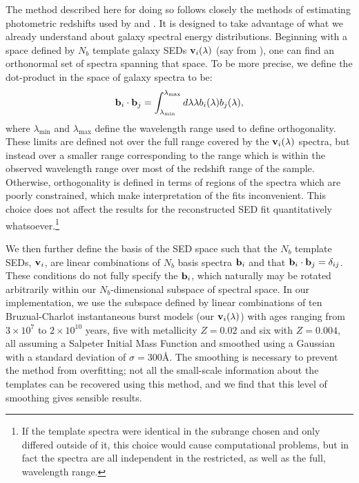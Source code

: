 \documentclass[10pt,preprint]{aastex}
\newcommand{\vv}[1]{{\bf #1}}
\begin{document}
The method described here for doing so follows closely the methods of
estimating photometric redshifts used by \citet{csabai00a} and
\citet{budavari00a}. It is designed to take advantage of what we
already understand about galaxy spectral energy distributions.
Beginning with a space defined by $N_b$ template galaxy SEDs
$\vv{v}_i(\lambda)$ (say from \citealt{bruzual93a}), one can find an
orthonormal set of spectra spanning that space. To be more precise, we
define the dot-product in the space of galaxy spectra to be:
\begin{equation}
\vv{b}_i \cdot \vv{b}_j =
\int_{\lambda_{\mathrm{min}}}^{\lambda_{\mathrm{max}}} d\lambda
\lambda b_i(\lambda) b_j(\lambda),
\end{equation}
where $\lambda_{\mathrm{min}}$ and $\lambda_{\mathrm{max}}$ define the
wavelength range used to define orthogonality. These limits are
defined not over the full range covered by the $\vv{v}_i(\lambda)$
spectra, but instead over a smaller range corresponding to the range
which is within the observed wavelength range over most of the
redshift range of the sample. Otherwise, orthogonality is defined in
terms of regions of the spectra which are poorly constrained, which
make interpretation of the fits inconvenient.  This choice does not
affect the results for the reconstructed SED fit quantitatively
whatsoever.\footnote{If the template spectra were identical in the
subrange chosen and only differed outside of it, this choice would
cause computational problems, but in fact the spectra are all
independent in the restricted, as well as the full, wavelength range.}

We then further define the basis of the SED space such that the $N_b$
template SEDs, $\vv{v}_i$, are linear combinations of $N_b$ basis
spectra $\vv{b}_i$ and that $\vv{b}_i \cdot \vv{b}_j =
\delta_{ij}$. These conditions do not fully specify the $\vv{b}_i$,
which naturally may be rotated arbitrarily within our
$N_b$-dimensional subspace of spectral space.  In our implementation,
we use the subspace defined by linear combinations of ten
Bruzual-Charlot instantaneous burst models (our $\vv{v}_i(\lambda)$)
with ages ranging from $3 \times 10^7$ to $2\times 10^{10}$ years,
five with metallicity $Z=0.02$ and six with $Z=0.004$, all assuming a
Salpeter Initial Mass Function and smoothed using a Gaussian with a
standard deviation of $\sigma = 300$\AA. The smoothing is necessary
to prevent the method from overfitting; not all the small-scale
information about the templates can be recovered using this method,
and we find that this level of smoothing gives sensible results.
\end{document}
